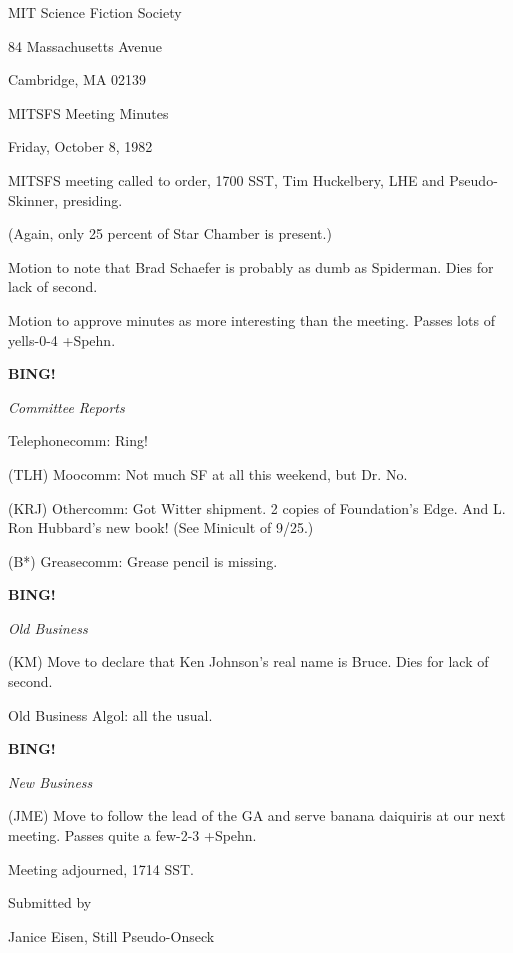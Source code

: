 \documentclass[12pt]{article}
\newcommand{\bing}{{\bf BING!} }
\newcommand{\goto}[1]{\bing \vskip 12pt \centerline{{\em{#1}}}}
\begin{document}
\begin{center}

MIT Science Fiction Society 

84 Massachusetts Avenue

Cambridge, MA 02139

\vspace{12pt}

MITSFS Meeting Minutes 

Friday, October 8, 1982

\end{center}
 
\vspace{18pt}

\setlength{\parskip}{6pt}

\noindent
MITSFS meeting called to order, 1700 SST,
Tim Huckelbery, LHE and Pseudo-Skinner, presiding.

(Again, only 25 percent of Star Chamber is present.)

Motion to note that Brad Schaefer is probably as dumb as Spiderman. Dies for lack of second.

Motion to approve minutes as more interesting than the meeting. Passes lots of yells-0-4 +Spehn.

\goto{Committee Reports}

Telephonecomm: Ring!

(TLH) Moocomm: Not much SF at all this weekend, but Dr. No.

(KRJ) Othercomm: Got Witter shipment. 2 copies of Foundation's Edge. And L. Ron Hubbard's new book! (See Minicult of 9/25.)

(B*) Greasecomm: Grease pencil is missing.

\goto{Old Business}

(KM) Move to declare that Ken Johnson's real name is Bruce. Dies for lack of second.

Old Business Algol: all the usual.

\goto{New Business}

(JME) Move to follow the lead of the GA and serve banana daiquiris at our next meeting. Passes quite a few-2-3 +Spehn.

\vspace{12pt}

\noindent
Meeting adjourned, 1714 SST.

\vspace{18pt}

\centerline{Submitted by}
\centerline{Janice Eisen, Still Pseudo-Onseck}
\end{document}
